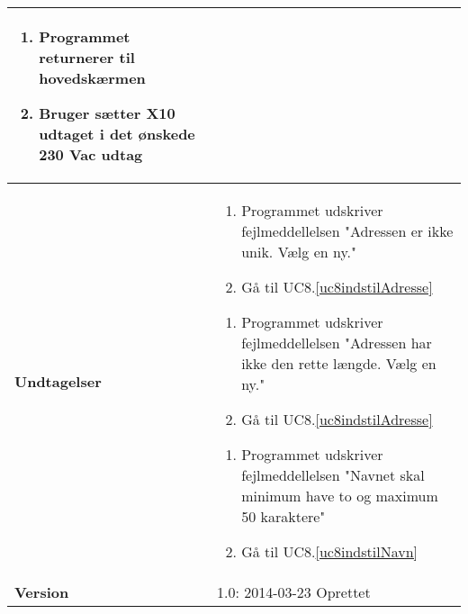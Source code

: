 \begin{table}[H]
\begin{tabular}{|p{6cm}|p{8cm}|}
\begin{enumerate}
				\item Programmet returnerer til hovedskærmen
				
				\item Bruger sætter X10 udtaget i det ønskede 230 Vac udtag
																																	
			\end{enumerate}\\\hline
		
		\textbf{Undtagelser}					
		&\begin{enumerate}[label= \ref{uc8adresse}a.\arabic*.]
			\item Programmet udskriver fejlmeddellelsen "Adressen er ikke unik. Vælg en ny."
			
			\item Gå til UC8.\ref{uc8indstilAdresse}
		\end{enumerate}
		
	
		
		\begin{enumerate}[label= \ref{uc8adresse}b.\arabic*.]
			\item Programmet udskriver fejlmeddellelsen "Adressen har ikke den rette længde. Vælg en ny."
			
			\item Gå til UC8.\ref{uc8indstilAdresse}
		\end{enumerate}
		
		
		
		\begin{enumerate}[label= \ref{uc8navn}a.\arabic*.]
			\item Programmet udskriver fejlmeddellelsen "Navnet skal minimum have to og maximum 50 karaktere"
			
			\item Gå til UC8.\ref{uc8indstilNavn}
		\end{enumerate} \\ \hline
											
		\textbf{Version}		&1.0: 2014-03-23 Oprettet \\\hline

	\end{tabular}
	\label{UC8} 
\end{table}